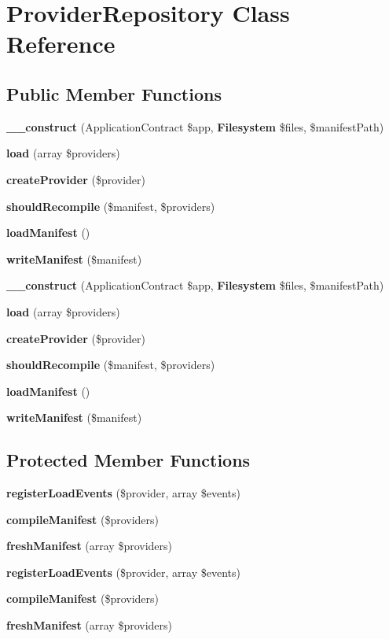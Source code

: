 \section{Provider\+Repository Class Reference}
\label{class_illuminate_1_1_foundation_1_1_provider_repository}
\subsection*{Public Member Functions}
\begin{DoxyCompactItemize}
\item 
{\bf \+\_\+\+\_\+construct} (Application\+Contract \$app, {\bf Filesystem} \$files, \$manifest\+Path)
\item 
{\bf load} (array \$providers)
\item 
{\bf create\+Provider} (\$provider)
\item 
{\bf should\+Recompile} (\$manifest, \$providers)
\item 
{\bf load\+Manifest} ()
\item 
{\bf write\+Manifest} (\$manifest)
\item 
{\bf \+\_\+\+\_\+construct} (Application\+Contract \$app, {\bf Filesystem} \$files, \$manifest\+Path)
\item 
{\bf load} (array \$providers)
\item 
{\bf create\+Provider} (\$provider)
\item 
{\bf should\+Recompile} (\$manifest, \$providers)
\item 
{\bf load\+Manifest} ()
\item 
{\bf write\+Manifest} (\$manifest)
\end{DoxyCompactItemize}
\subsection*{Protected Member Functions}
\begin{DoxyCompactItemize}
\item 
{\bf register\+Load\+Events} (\$provider, array \$events)
\item 
{\bf compile\+Manifest} (\$providers)
\item 
{\bf fresh\+Manifest} (array \$providers)
\item 
{\bf register\+Load\+Events} (\$provider, array \$events)
\item 
{\bf compile\+Manifest} (\$providers)
\item 
{\bf fresh\+Manifest} (array \$providers)
\end{DoxyCompactItemize}
